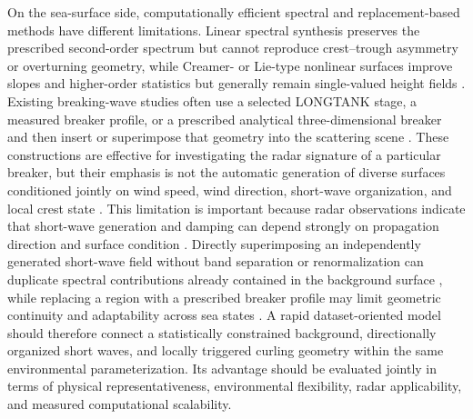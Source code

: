 On the sea-surface side, computationally efficient spectral and replacement-based methods have different limitations. Linear spectral synthesis preserves the prescribed second-order spectrum but cannot reproduce crest--trough asymmetry or overturning geometry, while Creamer- or Lie-type nonlinear surfaces improve slopes and higher-order statistics but generally remain single-valued height fields \cite{zhang2023secondorder,xie2024skewness}. Existing breaking-wave studies often use a selected LONGTANK stage, a measured breaker profile, or a prescribed analytical three-dimensional breaker and then insert or superimpose that geometry into the scattering scene \cite{holliday1998steepening,west1999ray,li2017facet,dong2023plunging}. These constructions are effective for investigating the radar signature of a particular breaker, but their emphasis is not the automatic generation of diverse surfaces conditioned jointly on wind speed, wind direction, short-wave organization, and local crest state \cite{li2017facet,dong2023plunging}. This limitation is important because radar observations indicate that short-wave generation and damping can depend strongly on propagation direction and surface condition \cite{sergievskaya2024shortwaves}. Directly superimposing an independently generated short-wave field without band separation or renormalization can duplicate spectral contributions already contained in the background surface \cite{xie2022convolutions,zhang2023secondorder}, while replacing a region with a prescribed breaker profile may limit geometric continuity and adaptability across sea states \cite{holliday1998steepening,li2017facet,dong2023plunging}. A rapid dataset-oriented model should therefore connect a statistically constrained background, directionally organized short waves, and locally triggered curling geometry within the same environmental parameterization. Its advantage should be evaluated jointly in terms of physical representativeness, environmental flexibility, radar applicability, and measured computational scalability.

